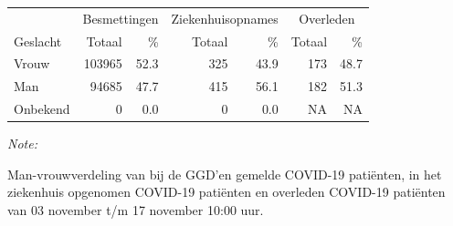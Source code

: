 \documentclass[
  english,
  man,floatsintext]{apa6}
\begin{document}
\begin{table}
\centering\begingroup\fontsize{11}{13}\selectfont

\begin{threeparttable}
\begin{tabular}{lrrrrrr}
\toprule
\multicolumn{1}{c}{ } & \multicolumn{2}{c}{Besmettingen} & \multicolumn{2}{c}{Ziekenhuisopnames} & \multicolumn{2}{c}{Overleden} \\
\cmidrule(l{3pt}r{3pt}){2-3} \cmidrule(l{3pt}r{3pt}){4-5} \cmidrule(l{3pt}r{3pt}){6-7}
Geslacht & Totaal & \% & Totaal & \% & Totaal & \%\\
\midrule
Vrouw & 103965 & 52.3 & 325 & 43.9 & 173 & 48.7\\
Man & 94685 & 47.7 & 415 & 56.1 & 182 & 51.3\\
Onbekend & 0 & 0.0 & 0 & 0.0 & NA & NA\\
\bottomrule
\end{tabular}
\begin{tablenotes}
\item \textit{Note: } 
\item Man-vrouwverdeling van bij de GGD’en gemelde COVID-19 patiënten, in het ziekenhuis opgenomen COVID-19 patiënten en overleden COVID-19 patiënten van 03 november t/m 17 november 10:00 uur.
\end{tablenotes}
\end{threeparttable}
\endgroup{}
\end{table}
\newpage
\end{document}
